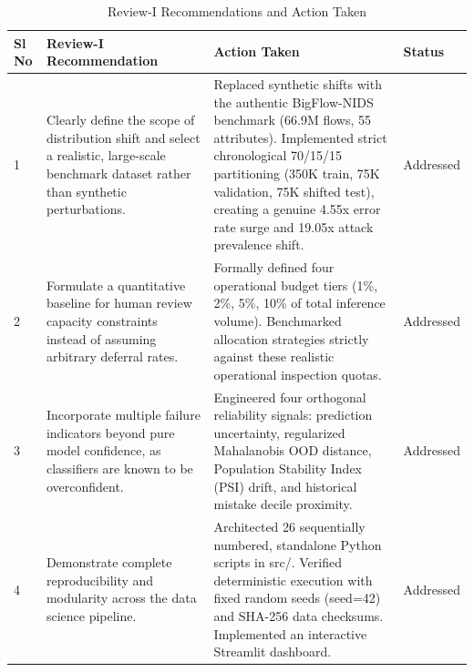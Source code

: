 \begin{table}[H]
\centering
\small
\begin{tabular}{p{} p{} p{} p{}}
\toprule
\textbf{Sl No} & \textbf{Review-I Recommendation} & \textbf{Action Taken} & \textbf{Status} \\
\midrule
1 & Clearly define the scope of distribution shift and select a realistic, large-scale benchmark dataset rather than synthetic perturbations. & Replaced synthetic shifts with the authentic BigFlow-NIDS benchmark (66.9M flows, 55 attributes). Implemented strict chronological 70/15/15 partitioning (350K train, 75K validation, 75K shifted test), creating a genuine 4.55x error rate surge and 19.05x attack prevalence shift. & Addressed \\
2 & Formulate a quantitative baseline for human review capacity constraints instead of assuming arbitrary deferral rates. & Formally defined four operational budget tiers (1\%, 2\%, 5\%, 10\% of total inference volume). Benchmarked allocation strategies strictly against these realistic operational inspection quotas. & Addressed \\
3 & Incorporate multiple failure indicators beyond pure model confidence, as classifiers are known to be overconfident. & Engineered four orthogonal reliability signals: prediction uncertainty, regularized Mahalanobis OOD distance, Population Stability Index (PSI) drift, and historical mistake decile proximity. & Addressed \\
4 & Demonstrate complete reproducibility and modularity across the data science pipeline. & Architected 26 sequentially numbered, standalone Python scripts in src/. Verified deterministic execution with fixed random seeds (seed=42) and SHA-256 data checksums. Implemented an interactive Streamlit dashboard. & Addressed \\
\bottomrule
\end{tabular}
\caption{Review-I Recommendations and Action Taken}
\end{table}

